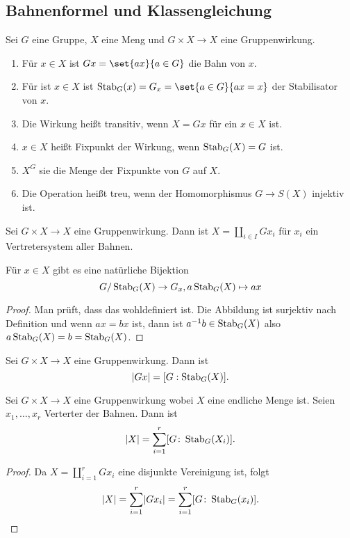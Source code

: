 \subsection{Bahnenformel und Klassengleichung}
\begin{Def}
    Sei \(G\) eine Gruppe, \(X\) eine Meng und \(G\times X\to X\) eine Gruppenwirkung.
    \begin{enumerate}
        \item Für \(x\in X\) ist \(Gx=\set{ax}{a\in G}\) die Bahn von \(x\).
        \item Für ist \(x\in X\) ist \(\Stab_G(x)=G_x=\set{a\in G}{ax=x}\) der Stabilisator von \(x\).
        \item Die Wirkung heißt transitiv, wenn \(X=Gx\) für ein \(x\in X\) ist.
        \item \(x\in X\) heißt Fixpunkt der Wirkung, wenn \(\operatorname{Stab}_G(X)=G\) ist.
        \item \(X^G\) sie die Menge der Fixpunkte von \(G\) auf \(X\).
        \item Die Operation heißt treu, wenn der Homomorphismus \(G\to S(X)\) injektiv ist.
    \end{enumerate}
\end{Def}
\begin{Bem}
    Sei \(G\times X\to X\) eine Gruppenwirkung. Dann ist \(X=\coprod _{i\in I}Gx_i\) für \(x_i\) ein Vertretersystem aller Bahnen.
\end{Bem}
\begin{Lemma}\label{Lem:Bahnengleichung1}
    Für \(x\in X\) gibt es eine natürliche Bijektion 
    \[G/\operatorname{Stab}_G(X)\to G_x, a\operatorname{Stab}_G(X)\mapsto ax\]
\end{Lemma}
\begin{proof}
    Man prüft, dass das wohldefiniert ist. Die Abbildung ist surjektiv nach Definition und wenn \(ax=bx\) ist, dann ist \(a^{-1}b\in\operatorname{Stab}_G(X)\) also \(a\operatorname{Stab}_G(X)=b=\operatorname{Stab}_G(X)\).
\end{proof}
\begin{Kor}
    Sei \(G\times X\to X\) eine Gruppenwirkung. Dann ist 
    \[\lvert Gx\rvert=[G:\operatorname{Stab}_G(X)].\]
\end{Kor}
\begin{Satz}[Bahnengleichung]\label{Satz:Bahnengleichung}
    Sei \(G\times X\to X\) eine Gruppenwirkung wobei \(X\) eine endliche Menge ist. Seien \(x_1,\dots,x_r\) Verterter der Bahnen. Dann ist 
    \[\lvert X\rvert=\sum_{i=1}^r[G\colon\operatorname{Stab}_G(X_i)].\]
\end{Satz}
\begin{proof}
    Da \(X=\coprod_{i=1}^rGx_i\) eine disjunkte Vereinigung ist, folgt 
    \[\lvert X\rvert=\sum_{i=1}^r\lvert Gx_i\rvert=\sum_{i=1}^r[G\colon\operatorname{Stab}_G(x_i)].\]
\end{proof}
